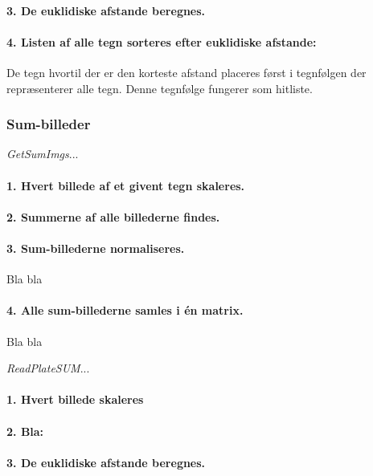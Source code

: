\paragraph{3. De euklidiske afstande beregnes.}

\paragraph{4. Listen af alle tegn sorteres efter euklidiske afstande:} De tegn hvortil der er den korteste afstand placeres først i tegnfølgen der repræsenterer alle tegn. Denne tegnfølge fungerer som hitliste.

\subsubsection{Sum-billeder}

\textit{GetSumImgs}...

\paragraph{1. Hvert billede af et givent tegn skaleres.}

\paragraph{2. Summerne af alle billederne findes.}

\paragraph{3. Sum-billederne normaliseres.} Bla bla

\paragraph{4. Alle sum-billederne samles i én matrix.} Bla bla

\textit{ReadPlateSUM}...

\paragraph{1. Hvert billede skaleres}

\paragraph{2. Bla:}

\paragraph{3. De euklidiske afstande beregnes.}

